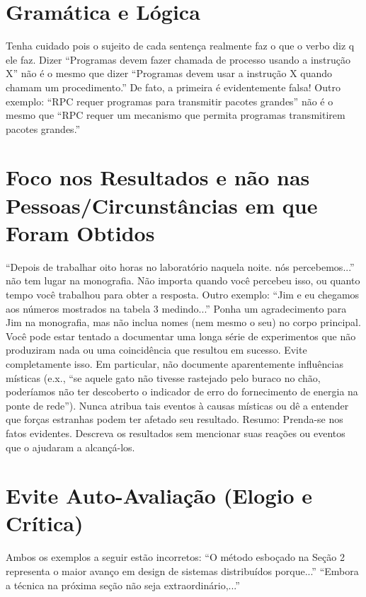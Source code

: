 \section{Gramática e Lógica}

Tenha cuidado pois o sujeito de cada sentença realmente faz o que o verbo diz q ele faz. 
Dizer ``Programas devem fazer chamada de processo usando a instrução X'' não é o mesmo que dizer ``Programas devem usar a instrução X quando chamam um procedimento.'' 
De fato, a primeira é evidentemente falsa! 
Outro exemplo: ``RPC requer programas para transmitir pacotes grandes'' não é o mesmo que ``RPC requer um mecanismo que permita programas transmitirem pacotes grandes.''

\section{Foco nos Resultados e não nas Pessoas/Circunstâncias em que Foram Obtidos}
		
``Depois de trabalhar oito horas no laboratório naquela noite. nós percebemos...'' não tem lugar na monografia. 
Não importa quando você percebeu isso, ou quanto tempo você trabalhou para obter a resposta. 
Outro exemplo: ``Jim e eu chegamos aos números mostrados na tabela 3 medindo...'' Ponha um agradecimento para Jim na monografia, mas não inclua nomes (nem mesmo o seu) no corpo principal. 
Você pode estar tentado a documentar uma longa série de experimentos que não produziram nada ou uma coincidência que resultou em sucesso. Evite completamente isso. 
Em particular, não documente aparentemente influências místicas (e.x., ``se aquele gato não tivesse rastejado pelo buraco no chão, poderíamos 
não ter descoberto o indicador de erro do fornecimento de energia na ponte de rede''). Nunca atribua tais eventos à causas místicas ou dê a 
entender que forças estranhas podem ter afetado seu resultado. 
Resumo: Prenda-se nos fatos evidentes. Descreva os resultados sem mencionar suas reações ou eventos que o ajudaram a alcançá-los.

\section{Evite Auto-Avaliação (Elogio e Crítica)}

Ambos os exemplos a seguir estão incorretos: ``O método esboçado na Seção 2 representa o maior avanço em design de sistemas distribuídos porque...'' 
``Embora a técnica na próxima seção não seja extraordinário,...''

